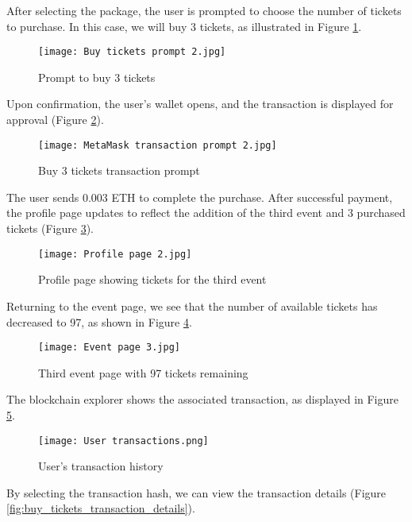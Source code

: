 After selecting the package, the user is prompted to choose the number of
tickets to purchase. In this case, we will buy 3 tickets, as illustrated in
Figure \ref{fig:buy_tickets_prompt_2}.

\begin{figure}[H]
    \texttt{[image: Buy tickets prompt 2.jpg]}
    \centering
    \caption{Prompt to buy 3 tickets}
    \label{fig:buy_tickets_prompt_2}
\end{figure}

Upon confirmation, the user's wallet opens, and the transaction is displayed
for approval (Figure \ref{fig:buy_tickets_transaction}).

\begin{figure}[H]
    \texttt{[image: MetaMask transaction prompt 2.jpg]}
    \centering
    \caption{Buy 3 tickets transaction prompt}
    \label{fig:buy_tickets_transaction}
\end{figure}

The user sends 0.003 ETH to complete the purchase. After successful payment,
the profile page updates to reflect the addition of the third event and 3
purchased tickets (Figure \ref{fig:profile_page_2}).

\begin{figure}[H]
    \texttt{[image: Profile page 2.jpg]}
    \centering
    \caption{Profile page showing tickets for the third event}
    \label{fig:profile_page_2}
\end{figure}

Returning to the event page, we see that the number of available tickets has
decreased to 97, as shown in Figure \ref{fig:buy_tickets_event_2}.

\begin{figure}[H]
    \texttt{[image: Event page 3.jpg]}
    \centering
    \caption{Third event page with 97 tickets remaining}
    \label{fig:buy_tickets_event_2}
\end{figure}

The blockchain explorer shows the associated transaction, as displayed in
Figure \ref{fig:user_transactions}.

\begin{figure}[H]
    \texttt{[image: User transactions.png]}
    \centering
    \caption{User's transaction history}
    \label{fig:user_transactions}
\end{figure}

By selecting the transaction hash, we can view the transaction details (Figure
\ref{fig:buy_tickets_transaction_details}).

